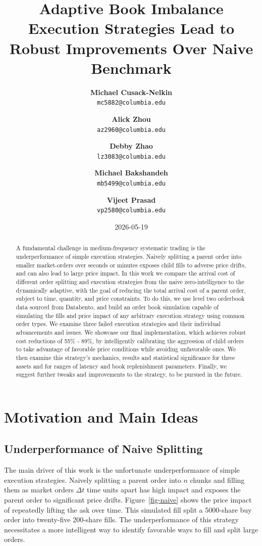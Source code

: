 \documentclass[
  letterpaper,
]{article}
\title{Adaptive Book Imbalance Execution Strategies Lead to Robust
Improvements Over Naive Benchmark}
\author{
\textbf{Michael Cusack-Nelkin}%
\\%
%
\texttt{mc5882@columbia.edu}\and 
\textbf{Alick Zhou}%
\\%
%
\texttt{az2960@columbia.edu}\and 
\textbf{Debby Zhao}%
\\%
%
\texttt{lz3083@columbia.edu}\and 
\textbf{Michael Bakshandeh}%
\\%
%
\texttt{mb5499@columbia.edu}\and 
\textbf{Vijeet Prasad}%
\\%
%
\texttt{vp2580@columbia.edu}}
\date{2026-05-19}
\begin{document}
\maketitle
\begin{abstract}
A fundamental challenge in medium-frequency systematic trading is the
underperformance of simple execution strategies. Naively splitting a
parent order into smaller market-orders over seconds or minutes exposes
child fills to adverse price drifts, and can also lead to large price
impact. In this work we compare the arrival cost of different order
splitting and execution strategies from the naive zero-intelligence to
the dynamically adaptive, with the goal of reducing the total arrival
cost of a parent order, subject to time, quantity, and price
constraints. To do this, we use level two orderbook data sourced from
Databento, and build an order book simulation capable of simulating the
fills and price impact of any arbitrary execution strategy using common
order types. We examine three failed execution strategies and their
individual advancements and issues. We showcase our final
implementation, which achieves robust cost reductions of 55\% - 89\%, by
intelligently calibrating the aggression of child orders to take
advantage of favorable price conditions while avoiding unfavorable ones.
We then examine this strategy's mechanics, results and statistical
significance for three assets and for ranges of latency and book
replenishment parameters. Finally, we suggest further tweaks and
improvements to the strategy, to be pursued in the future.
\end{abstract}


\section{Motivation and Main Ideas}\label{motivation-and-main-ideas}

\subsection{Underperformance of Naive
Splitting}\label{underperformance-of-naive-splitting}

The main driver of this work is the unfortunate underperformance of
simple execution strategies. Naively splitting a parent order into \(n\)
chunks and filling them as market orders \(\Delta t\) time units apart
has high impact and exposes the parent order to significant price
drifts. Figure~\ref{fig-naive} shows the price impact of repeatedly
lifting the ask over time. This simulated fill split a 5000-share buy
order into twenty-five 200-share fills. The underperformance of this
strategy necessitates a more intelligent way to identify favorable ways
to fill and split large orders.
\end{document}
